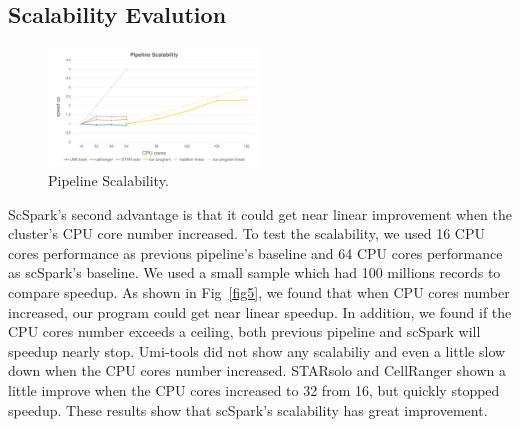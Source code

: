 \documentclass[10pt,journal,compsoc]{IEEEtran}
\begin{document}
\subsection{Scalability Evalution}
\begin{figure}
	\includegraphics[width=0.5\textwidth]{fig4.pdf}
	\caption{Pipeline Scalability.} \label{fig4}
\end{figure}
ScSpark's second advantage is that it could get near linear improvement when the cluster's CPU core number increased. 
To test the scalability, we used 16 CPU cores performance as previous pipeline's baseline and 64 CPU cores performance as scSpark's baseline. 
We used a small sample which had 100 millions records to compare speedup. 
As shown in Fig~\ref{fig5}, we found that when CPU cores number increased, our program could get near linear speedup. 
In addition, we found if the CPU cores number exceeds a ceiling, both previous pipeline and scSpark will speedup nearly stop. 
Umi-tools did not show any scalabiliy and even a little slow down when the CPU cores number increased. 
STARsolo and CellRanger shown a little improve when the CPU cores increased to 32 from 16, but quickly stopped speedup. 
These results show that scSpark's scalability has great improvement. 
\end{document}
